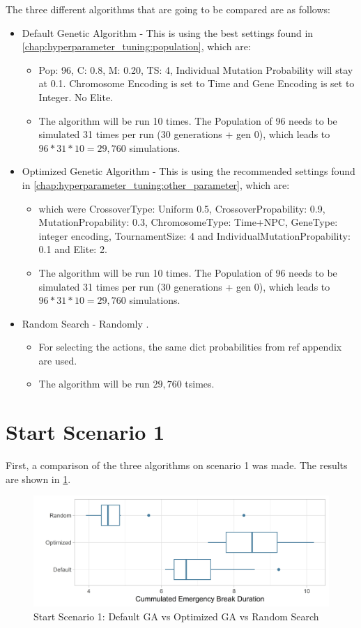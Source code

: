 The three different algorithms that are going to be compared are as follows:
\begin{itemize}
	\item Default Genetic Algorithm - This is using the best settings found in \ref{chap:hyperparameter_tuning:population}, which are:
	\begin{itemize}
		\item Pop: 96, C: 0.8, M: 0.20, TS: 4, Individual Mutation Probability will stay at 0.1. Chromosome Encoding is set to Time and Gene Encoding is set to Integer. No Elite. 
		\item The algorithm will be run 10 times. The Population of 96 needs to be simulated 31 times per run (30 generations + gen 0), which leads to $96 * 31 * 10 = 29,760$ simulations.
	\end{itemize}
	\item Optimized Genetic Algorithm - This is using the recommended settings found in \ref{chap:hyperparameter_tuning:other_parameter}, which are:
	\begin{itemize}
		\item 	which were CrossoverType: Uniform 0.5, CrossoverPropability: 0.9, MutationPropability: 0.3, ChromosomeType: Time+NPC, GeneType: integer encoding, TournamentSize: 4 and IndividualMutationPropability: 0.1 and Elite: 2. 
		\item The algorithm will be run 10 times. The Population of 96 needs to be simulated 31 times per run (30 generations + gen 0), which leads to $96 * 31 * 10 = 29,760$ simulations.
	\end{itemize}
	\item Random Search - Randomly .
	\begin{itemize}
		\item For selecting the actions, the same dict probabilities from ref appendix are used. 
		\item The algorithm will be run $29,760$ tsimes.
	\end{itemize}
\end{itemize}

\section{Start Scenario 1}
First, a comparison of the three algorithms on scenario 1 was made. The results are shown in \ref{figure:sim_1_comparison}.

\begin{figure}[ht] 
	\label{figure:sim_1_comparison}
	\includegraphics[width=1\linewidth]{simulations/evaluation/plots/sim_1_comparison}
	\caption{Start Scenario 1: Default GA vs Optimized GA vs Random Search}
\end{figure}

